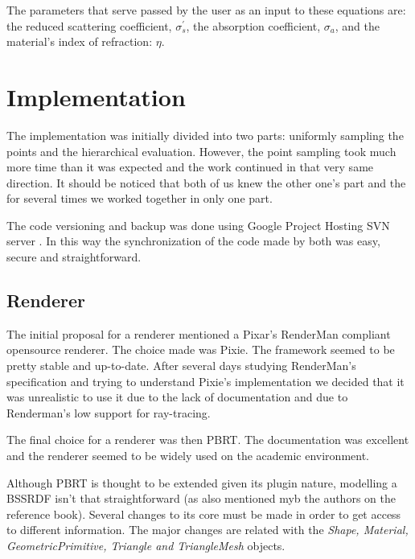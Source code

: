 \documentclass{article}
\begin{document}
The parameters that serve passed by the user as an input to these equations are: the  reduced scattering coefficient, ${\sigma} _s ^{\prime}$, the absorption coefficient, ${\sigma} _a$, and the material's index of refraction: $\eta$.

\section{Implementation}
The implementation was initially divided into two parts: uniformly sampling the points and the hierarchical evaluation. However, the point sampling took much more time than it was expected and the work continued in that very same direction. It should be noticed that both of us knew the other one's part and the for several times we worked together in only one part.

The code versioning and backup was done using Google Project Hosting SVN server \cite{SVN}. In this way the synchronization of the code made by both was easy, secure and straightforward.

\subsection{Renderer}
The initial proposal for a renderer mentioned a Pixar's RenderMan{\textregistered} compliant opensource renderer. The choice made was Pixie. The framework seemed to be pretty stable and up-to-date. After several days studying RenderMan{\textregistered}'s specification and trying to understand Pixie's implementation we decided that it was unrealistic to use it due to the lack of documentation and due to Renderman's low support for ray-tracing.

The final choice for a renderer was then PBRT\cite{PBRTBook}. The documentation was excellent and the renderer seemed to be widely used on the academic environment.

Although PBRT is thought to be extended given its plugin nature, modelling a BSSRDF isn't that straightforward (as also mentioned myb the authors on the reference book). Several changes to its core must be made in order to get access to different information. The major changes are related with the {\it Shape, Material, GeometricPrimitive, Triangle and TriangleMesh} objects.
\end{document}
